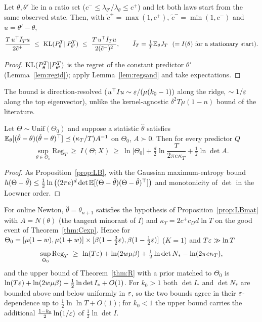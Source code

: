 \begin{proposition}\label{prop:twopoint}\Pt{}
Let $\theta,\theta'$ lie in a ratio set ($c^-\le\lambda_{\theta'}/\lambda_\theta\le c^+$) and let both laws start from the same observed state. Then, with $\tilde c^{+}=\max(1,c^+)$, $\tilde c^-=\min(1,c^-)$ and $u=\theta'-\theta$,
\[
\frac{T\,u\T\bar I_Tu}{2\tilde c^{+}}\ \le\ \KL(P_\theta^T\|P_{\theta'}^T)\ \le\ \frac{T\,u\T\bar I_Tu}{2(\tilde c^{-})^2},\qquad \bar I_T=\tfrac1T\E_\theta J_T\ \ (=I(\theta)\text{ for a stationary start}).
\]
\end{proposition}
\begin{proof}
$\mathrm{KL}(P_\theta^T\|P_{\theta'}^T)$ is the regret of the constant predictor $\theta'$ (Lemma~\ref{lem:regid}); apply Lemma~\ref{lem:regsand} and take expectations.
\end{proof}
The bound is direction-resolved ($u^{\top} Iu\sim\varepsilon/(\mu(k_0-1))$ along the ridge, $\sim1/\varepsilon$ along the top eigenvector), unlike the kernel-agnostic $\delta^2T\mu(1-n)$ bound of the literature.

\begin{proposition}\label{prop:LBmat}\Pt{}
Let $\Theta\sim\mathrm{Unif}(\Theta_0)$ and suppose a statistic $\hat\theta$ satisfies $\mathbb{E}_\theta[(\hat\theta-\theta)(\hat\theta-\theta)^{\top}]\preceq(\kappa_T/T)A^{-1}$ on $\Theta_0$, $A\succ0$. Then for every predictor $Q$
\[
\sup_{\theta\in\Theta_0}\mathrm{Reg}_T\ \ge\ I(\Theta;X)\ \ge\ \ln|\Theta_0|+\tfrac d2\ln\frac{T}{2\pi e\kappa_T}+\tfrac12\ln\det A .
\]
\end{proposition}
\begin{proof}
As Proposition~\ref{prop:LB}, with the Gaussian maximum-entropy bound $h(\Theta-\hat\theta)\le\frac12\ln\big((2\pi e)^d\det\mathbb{E}[(\Theta-\hat\theta)(\Theta-\hat\theta)^{\top}]\big)$ and monotonicity of $\det$ in the Loewner order.
\end{proof}

\begin{theorem}\label{thm:LBeps}\Ps{}
For online Newton, $\hat\theta=\theta_{n+1}$ satisfies the hypothesis of Proposition~\ref{prop:LBmat} with $A=N(\theta)$ (the tangent minorant of $I$) and $\kappa_T=2c^+c_Dd\ln T$ on the good event of Theorem~\ref{thm:Cexp}. Hence for $\Theta_0=[\mu(1-w),\mu(1+w)]\times[\beta(1-\tfrac32\varepsilon),\beta(1-\tfrac12\varepsilon)]$ ($K=1$) and $T\varepsilon\gg\ln T$
\[
\sup_{\Theta_0}\mathrm{Reg}_T\ \ge\ \ln(T\eps)+\ln(2w\mu\beta)+\tfrac12\ln\det N_*-\ln(2\pi e\kappa_T),
\]
and the upper bound of Theorem~\ref{thm:R} with a prior matched to $\Theta_0$ is $\ln(T\varepsilon)+\ln(2w\mu\beta)+\tfrac12\ln\det I_*+O(1)$. For $k_0>1$ both $\det I_*$ and $\det N_*$ are bounded above and below uniformly in $\varepsilon$, so the two bounds agree in their $\varepsilon$-dependence up to $\tfrac12\ln\ln T+O(1)$; for $k_0<1$ the upper bound carries the additional $\tfrac{1-k_0}2\ln(1/\varepsilon)$ of $\tfrac12\ln\det I$.
\end{theorem}
